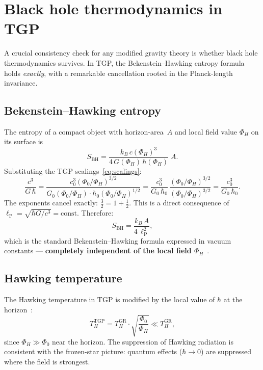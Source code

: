 \documentclass[11pt,a4paper]{article}
\theoremstyle{definition}
\theoremstyle{remark}
\newcommand{\PhiZero}{\varPhi_0}
\newcommand{\lP}{\ell_{\mathrm{P}}}
\renewcommand{\Phi}{\varPhi}
\begin{document}
\section{Black hole thermodynamics in TGP}\label{sec:thermo}

A crucial consistency check for any modified gravity theory is whether
black hole thermodynamics survives.  In TGP, the Bekenstein--Hawking
entropy formula holds \emph{exactly}, with a remarkable cancellation
rooted in the Planck-length invariance.

\subsection{Bekenstein--Hawking entropy}

The entropy of a compact object with horizon-area~$A$ and local field
value $\Phi_H$ on its surface is
\begin{equation}\label{eq:S-BH-local}
  S_{\mathrm{BH}}
  = \frac{k_B\,c(\Phi_H)^3}{4\,G(\Phi_H)\,\hbar(\Phi_H)}\;A.
\end{equation}
Substituting the TGP scalings~\eqref{eq:scalings}:
\begin{equation}\label{eq:S-cancellation}
  \frac{c^3}{G\,\hbar}
  = \frac{c_0^3(\PhiZero/\Phi_H)^{3/2}}
         {G_0(\PhiZero/\Phi_H)\cdot\hbar_0(\PhiZero/\Phi_H)^{1/2}}
  = \frac{c_0^3}{G_0\,\hbar_0}\,
    \frac{(\PhiZero/\Phi_H)^{3/2}}{(\PhiZero/\Phi_H)^{3/2}}
  = \frac{c_0^3}{G_0\,\hbar_0}.
\end{equation}
The exponents cancel exactly: $\frac{3}{2} = 1 + \frac{1}{2}$.  This is
a direct consequence of $\lP = \sqrt{\hbar G/c^3} = \mathrm{const}$.
Therefore:
\begin{equation}\label{eq:S-BH-final}
  \boxed{S_{\mathrm{BH}}
  = \frac{k_B\,A}{4\,\lP^2},}
\end{equation}
which is the standard Bekenstein--Hawking formula expressed in
vacuum constants --- \textbf{completely independent of the local field
$\Phi_H$}~\cite{Bekenstein1973,Hawking1975}.

\subsection{Hawking temperature}

The Hawking temperature in TGP is modified by the local value of
$\hbar$ at the horizon~\cite{Serafin2026-full}:
\begin{equation}\label{eq:T-Hawking}
  T_H^{\mathrm{TGP}}
  = T_H^{\mathrm{GR}} \cdot \sqrt{\frac{\PhiZero}{\Phi_H}}
  \ll T_H^{\mathrm{GR}},
\end{equation}
since $\Phi_H \gg \PhiZero$ near the horizon.  The suppression of
Hawking radiation is consistent with the frozen-star picture: quantum
effects ($\hbar \to 0$) are suppressed where the field is strongest.
\end{document}
